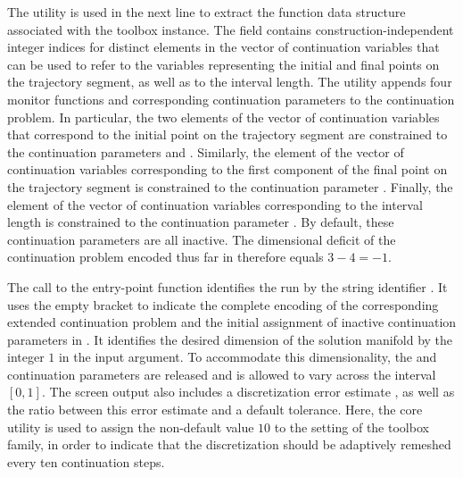 The  utility is used in the next line to extract the function data structure associated with the  toolbox instance. The  field contains construction-independent integer indices for distinct elements in the vector of continuation variables that  can be used to refer to the variables representing the initial and final points on the trajectory segment, as well as to the interval length. The  utility appends four monitor functions and corresponding continuation parameters to the continuation problem. In particular, the two elements of the vector of continuation variables that correspond to the initial point on the trajectory segment are constrained to the continuation parameters  and . Similarly, the element of the vector of continuation variables corresponding to the first component of the final point on the trajectory segment is constrained to the continuation parameter . Finally, the element of the vector of continuation variables corresponding to the interval length is constrained to the continuation parameter . By default, these continuation parameters are all inactive. The dimensional deficit of the continuation problem encoded thus far in  therefore equals $3-4=-1$.

The call to the  entry-point function identifies the run by the string identifier . It uses the empty bracket to indicate the complete encoding of the corresponding extended continuation problem and the initial assignment of inactive continuation parameters in . It identifies the desired dimension of the solution manifold by the integer $1$ in the  input argument. To accommodate this dimensionality, the  and  continuation parameters are released and  is allowed to vary across the interval $[0,1]$. The screen output also includes a discretization error estimate , as well as the ratio  between this error estimate and a default tolerance. Here, the  core utility is used to assign the non-default value $10$ to the  setting of the  toolbox family, in order to indicate that the discretization should be adaptively remeshed every ten continuation steps.

